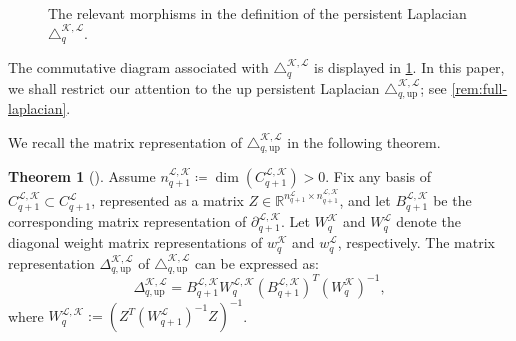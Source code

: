 \documentclass{article}
\theoremstyle{definition}
\newtheorem{theorem}{Theorem}[section]
\newcommand{\KK}{\mathcal{K}}
\newcommand{\LL}{\mathcal{L}}
\begin{document}
\begin{figure}
\centering
{}
\caption{The relevant morphisms in the definition of the persistent Laplacian $\triangle_{q}^{\KK, \LL}$.}
\label{fig_dig_per_lap}
\end{figure}

The commutative diagram associated with $\triangle_{q}^{\KK, \LL}$ is displayed in \cref{fig_dig_per_lap}. In this paper, we shall restrict our attention to the up persistent Laplacian $\triangle_{q, \mathrm{up}}^{\KK, \LL}$; see \cref{rem:full-laplacian}.

We recall the matrix representation of $\triangle_{q, \mathrm{up}}^{\KK, \LL}$ in the following theorem.

\begin{theorem}[{\cite[Theorem 3.1]{pers_lap}}]\label{thm_memoli}
Assume $n_{q+1}^{\LL, \KK}\coloneqq \dim(C_{q+1}^{\LL, \KK})>0$.
Fix any basis of $C_{q+1}^{\LL, \KK}\subset C_{q+1}^{\LL}$, represented as a matrix $Z\in \mathbb{R}^{n_{q+1}^\LL\times n_{q+1}^{\LL, \KK}}$, and let $B_{q+1}^{\LL, \KK}$ be the corresponding matrix representation of $\partial_{q+1}^{\LL, \KK}$.
Let $W_{q}^\KK$ and $W_q^\LL$ denote the diagonal weight matrix representations of $w_{q}^\KK$ and $w_q^\LL$, respectively. The matrix representation $\Delta_{q, \mathrm{up}}^{\KK, \LL}$ of $\triangle_{q, \mathrm{up}}^{\KK, \LL}$ can be expressed as:
\begin{equation}\label{eqn:per_lap}
\Delta_{q, \mathrm{up}}^{\KK, \LL}
=
B_{q+1}^{\LL, \KK} W_{q}^{\LL, \KK}\left(B_{q+1}^{\LL, \KK}\right)^{T}(W_q^\KK)^{-1},
\end{equation}
where $W_{q}^{\LL, \KK}:=\left(Z^T (W_{q+1}^\LL)^{-1} Z\right)^{-1}$.
\end{theorem}
\end{document}
